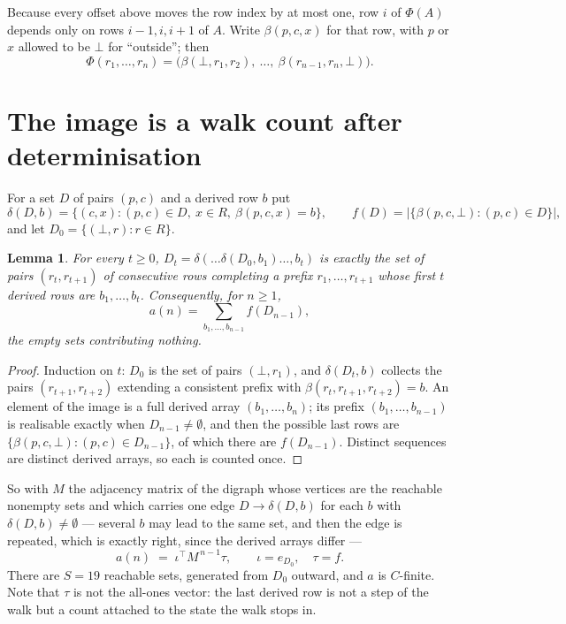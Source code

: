 \documentclass[11pt,a4paper]{article}
\theoremstyle{plain}
\newtheorem{lemma}[theorem]{Lemma}
\theoremstyle{definition}
\begin{document}
Because every offset above moves the row index by at most one, row $i$ of
$\Phi(A)$ depends only on rows $i-1,i,i+1$ of $A$. Write $\beta(p,c,x)$ for that row, with $p$
or $x$ allowed to be $\bot$ for ``outside''; then
\[
\Phi(r_1,\dots,r_n)=\bigl(\beta(\bot,r_1,r_2),\ \dots,\ \beta(r_{n-1},r_n,\bot)\bigr).
\]

\section{The image is a walk count after determinisation}

For a set $D$ of pairs $(p,c)$ and a derived row $b$ put
\[
\delta(D,b)=\{(c,x):(p,c)\in D,\ x\in R,\ \beta(p,c,x)=b\},\qquad
f(D)=\bigl|\{\beta(p,c,\bot):(p,c)\in D\}\bigr| ,
\]
and let $D_0=\{(\bot,r):r\in R\}$.

\begin{lemma}\label{lem:det}
For every $t\ge0$, $D_t=\delta(\dots\delta(D_0,b_1)\dots,b_t)$ is exactly the set of pairs
$(r_t,r_{t+1})$ of consecutive rows completing a prefix $r_1,\dots,r_{t+1}$ whose first $t$
derived rows are $b_1,\dots,b_t$. Consequently, for $n\ge1$,
\[
a(n)=\sum_{b_1,\dots,b_{n-1}}f(D_{n-1}),
\]
the empty sets contributing nothing.
\end{lemma}

\begin{proof}
Induction on $t$: $D_0$ is the set of pairs $(\bot,r_1)$, and $\delta(D_t,b)$ collects the
pairs $(r_{t+1},r_{t+2})$ extending a consistent prefix with
$\beta(r_t,r_{t+1},r_{t+2})=b$. An element of the image is a full derived array
$(b_1,\dots,b_n)$; its prefix $(b_1,\dots,b_{n-1})$ is realisable exactly when
$D_{n-1}\neq\emptyset$, and then the possible last rows are
$\{\beta(p,c,\bot):(p,c)\in D_{n-1}\}$, of which there are $f(D_{n-1})$. Distinct sequences
are distinct derived arrays, so each is counted once.
\end{proof}

So with $M$ the adjacency matrix of the digraph whose vertices are the reachable nonempty sets
and which carries one edge $D\to\delta(D,b)$ for each $b$ with $\delta(D,b)\neq\emptyset$ ---
several $b$ may lead to the same set, and then the edge is repeated, which is exactly right,
since the derived arrays differ ---
\[
a(n)\;=\;\iota^{\!\top}M^{\,n-1}\tau,\qquad \iota=e_{D_0},\quad \tau=f .
\]
There are $S=19$ reachable sets, generated from $D_0$ outward, and $a$ is $C$-finite.
Note that $\tau$ is not the all-ones vector: the last derived row is not a
step of the walk but a count attached to the state the walk stops in.
\end{document}
